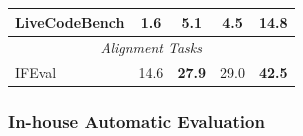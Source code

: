 \documentclass{article}
\begin{document}
\begin{table}[t]
\begin{tabular}{@{}lcccc@{}}
LiveCodeBench & 1.6 & \textbf{5.1} & 4.5 & \textbf{14.8} \\

\midrule

\multicolumn{5}{c}{\textit{Alignment Tasks}} \\

\midrule

IFEval & 14.6 & \textbf{27.9} & 29.0 & \textbf{42.5} \\

\bottomrule

\end{tabular}

\end{table}

\subsubsection{In-house Automatic Evaluation}
\end{document}
